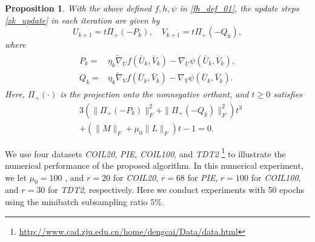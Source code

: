 \documentclass[letterpaper]{article} %
\newtheorem{proposition}{Proposition}
\begin{document}
	\begin{proposition}\label{Prop_GNMF}
		With the above defined $f,h,\psi$ in \eqref{fh_def_01}, the update steps \eqref{xk_update} in each iteration are given by 
		\[
		U_{k+1}=t\Pi_{+}(-P_{k}),\quad V_{k+1}=t\Pi_{+}(-Q_{k}),
		\] 
		where 
		\begin{align}\label{eqn:pkqk}
			\begin{aligned}
				P_{k}=&\eta_{k}\tilde{\nabla}_{U}f(\bar{U}_{k},\bar{V}_{k})-\nabla_{U}\psi(\bar{U}_{k},\bar{V}_{k}),\\
				Q_{k}=&\eta_{k}\tilde{\nabla}_{V}f(\bar{U}_{k},\bar{V}_{k})-\nabla_{V}\psi(\bar{U}_{k},\bar{V}_{k}).
			\end{aligned}
		\end{align} 
		Here, $\Pi_{+}(\cdot)$ is the projection onto the nonnegative orthant,  and $t\ge0$   satisfies
		\begin{align*}
			&3\left(\|\Pi_{+}(-P_{k})\|_{F}^{2}+\|\Pi_{+}(-Q_{k})\|_{F}^{2}\right)t^{3}\\
			&+(\|M\|_{F}+\mu_{0}\|L\|_{F})t-1=0.
		\end{align*}
	\end{proposition}
	
	We use four datasets \emph{COIL20}, \emph{PIE}, \emph{COIL100}, and \emph{TDT2} \footnote{\url{http://www.cad.zju.edu.cn/home/dengcai/Data/data.html}}   to illustrate the numerical performance of the proposed algorithm. In this numerical experiment, we let $\mu_{0}=100$ , and $r=20$ for \emph{COIL20}, $r=68$  for \emph{PIE}, $r=100$ for \emph{COIL100}, and $r=30$ for \emph{TDT2}, respectively. 
	Here we conduct experiments  with 50 epochs using the minibatch subsampling ratio  $5\%$.
	
	
\end{document}
